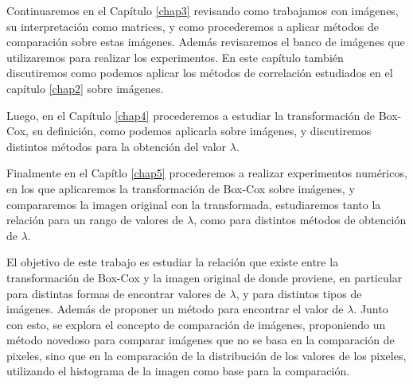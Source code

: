 Continuaremos en el Cap\'itulo \ref{chap3} revisando como trabajamos con im\'agenes, su interpretaci\'on como matrices, y como procederemos a aplicar m\'etodos de comparaci\'on sobre estas im\'agenes. Adem\'as revisaremos el banco de im\'agenes que utilizaremos para realizar los experimentos. En este cap\'itulo tambi\'en discutiremos como podemos aplicar los m\'etodos de correlaci\'on estudiados en el cap\'itulo \ref{chap2} sobre im\'agenes.

Luego, en el Cap\'itulo \ref{chap4} procederemos a estudiar la transformaci\'on de Box-Cox, su definici\'on, como podemos aplicarla sobre im\'agenes, y discutiremos distintos m\'etodos para la obtenci\'on del valor $\lambda$. 

Finalmente en el Cap\'itlo \ref{chap5} procederemos a realizar experimentos num\'ericos, en los que aplicaremos la transformaci\'on de Box-Cox sobre im\'agenes, y compararemos la imagen original con la transformada, estudiaremos tanto la relaci\'on para un rango de valores de $\lambda$, como para distintos m\'etodos de obtenci\'on de $\lambda$.

El objetivo de este trabajo es estudiar la relaci\'on que existe entre la transformaci\'on de Box-Cox y la imagen original de donde proviene, en particular para distintas formas de encontrar valores de $\lambda$, y para distintos tipos de im\'agenes. Adem\'as de proponer un m\'etodo para encontrar el valor de $\lambda$. Junto con esto, se explora el concepto de comparaci\'on de im\'agenes, proponiendo un m\'etodo novedoso para comparar im\'agenes que no se basa en la comparaci\'on de pixeles, sino que en la comparaci\'on de la distribuci\'on de los valores de los pixeles, utilizando el histograma de la imagen como base para la comparaci\'on.